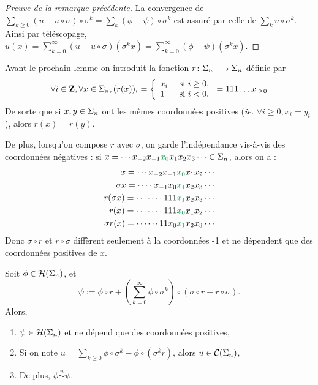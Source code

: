   \begin{proof}[Preuve de la remarque précédente]
    La convergence de $\sum_{k \geq 0}{(u - u\circ\sigma)\circ\sigma^k} = \sum_k{(\phi - \psi)\circ\sigma^k}$ est assuré
    par celle de $\sum_k{u\circ\sigma^k}$.
    Ainsi par téléscopage,
    $u(x) = \sum_{k=0}^{\infty}{(u - u \circ \sigma)(\sigma^k x)} = \sum_{k=0}^{\infty}{(\phi - \psi)(\sigma^k x)}$.
  \end{proof}

  Avant le prochain lemme on introduit la fonction $r \colon \Sigma_n \longrightarrow \Sigma_n$ définie par
  $$\forall i \in \mathbf Z, \forall x \in \Sigma_n, (r(x))_i = \left\{
    \begin{array}{ll}
      x_i &\text{ si } i \geq 0, \\
      1   &\text{ si } i < 0.
    \end{array} \right. = 111\hdots x_{|\geq 0}$$
    De sorte que si $x, y \in \Sigma_n$ ont les mêmes coordonnées positives (\textit{ie.} $\forall i \geq 0, x_i = y_i$), alors $r(x) = r(y)$.

    De plus, lorsqu'on compose $r$ avec $\sigma$, on garde l'indépendance vis-à-vis des coordonnées négatives :
    si $x = \cdots x_{-2}x_{-1}\textcolor{ForestGreen}{x_0} x_1 x_2 x_3\cdots \in \s_n$, alors on a :
    \begin{align*}
        x           = \cdots x_{-2}x_{-1}   &\textcolor{ForestGreen}{x_0} x_1 x_2\cdots \\
	\sigma x    = \cdots\cdot x_{-1}x_0 &\textcolor{ForestGreen}{x_1}x_2 x_3\cdots \\
	r(\sigma x) = \cdots\cdots\cdot 111 &\textcolor{ForestGreen}{x_1}x_2x_3\cdots \\
	r(x)	    = \cdots\cdots\cdot 111 &\textcolor{ForestGreen}{x_0}x_1 x_2\cdots \\
	\sigma r(x) = \cdots\cdots 11x_0    &\textcolor{ForestGreen}{x_1}x_2 x_3\cdots
    \end{align*}
    Donc $\sigma \circ r$ et $r \circ \sigma$ diffèrent seulement à la coordonnées -1 et ne dépendent que des coordonnées positives de $x$.

  \begin{lemma}
    Soit $\phi \in \mathcal{H} (\Sigma_{n})$, et
    $$\psi := \phi \circ r + \left(\sum_{k=0}^{\infty}{\phi \circ \sigma^k}\right)\circ(\sigma \circ r - r \circ \sigma).$$
    Alors,
    \begin{enumerate}
      \item $\psi \in \mathcal{H} (\Sigma_{n})$ et ne dépend que des coordonnées positives,
      \item Si on note $u = \sum_{k\geq 0}{\phi\circ\sigma^k - \phi\circ(\sigma^k r)}$, alors $u \in \mathcal{C} (\Sigma_{n})$,
      \item De plus, $\phi \overset{u}{\sim} \psi$.
    \end{enumerate}
  \end{lemma}

